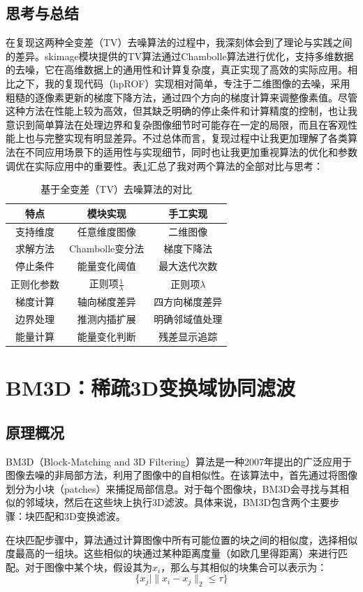 \documentclass[UTF8]{ctexart}
\begin{document}
\subsection{思考与总结}
在复现这两种全变差（TV）去噪算法的过程中，我深刻体会到了理论与实践之间的差异。skimage模块提供的TV算法通过Chambolle算法进行优化，支持多维数据的去噪，它在高维数据上的通用性和计算复杂度，真正实现了高效的实际应用。相比之下，我的复现代码（hpROF）实现相对简单，专注于二维图像的去噪，采用粗糙的逐像素更新的梯度下降方法，通过四个方向的梯度计算来调整像素值。尽管这种方法在性能上较为高效，但其缺乏明确的停⽌条件和计算精度的控制，也让我意识到简单算法在处理边界和复杂图像细节时可能存在一定的局限，而且在客观性能上也与完整实现有明显差异。不过总体而言，复现过程中让我更加理解了各类算法在不同应用场景下的适用性与实现细节，同时也让我更加重视算法的优化和参数调优在实际应用中的重要性。表\ref{tab:tvCompare}汇总了我对两个算法的全部对比与思考：
\begin{table}[htbp]
  \centering
  \caption{基于全变差（TV）去噪算法的对比}
  \label{tab:tvCompare}
  \begin{tabular}{ccc}
  \toprule[1.5pt]
  \textbf{特点} & \textbf{模块实现} & \textbf{手工实现} \\
  \midrule
  支持维度 & 任意维度图像 & 二维图像 \\
  求解方法 & Chambolle变分法 & 梯度下降法 \\
  停止条件 & 能量变化阈值 & 最大迭代次数 \\
  正则化参数 & 正则项$\frac{1}{\lambda}$ & 正则项$\lambda$ \\
  梯度计算 & 轴向梯度差异 & 四方向梯度差异 \\
  边界处理 & 推测内插扩展 & 明确邻域值处理 \\
  能量计算 & 能量变化判断 & 残差显示追踪 \\
  \bottomrule[1.5pt]
  \end{tabular}
\end{table}


\section{BM3D：稀疏3D变换域协同滤波}

\subsection{原理概况}
BM3D（Block-Matching and 3D Filtering）算法是一种2007年提出的广泛应用于图像去噪的非局部方法\cite{dabov_image_nodate}，利用了图像中的自相似性。在该算法中，首先通过将图像划分为小块（patches）来捕捉局部信息。对于每个图像块，BM3D会寻找与其相似的邻域块，然后在这些块上执行3D滤波。具体来说，BM3D包含两个主要步骤：块匹配和3D变换滤波。\par
在块匹配步骤中，算法通过计算图像中所有可能位置的块之间的相似度，选择相似度最高的一组块。这些相似的块通过某种距离度量（如欧几里得距离）来进行匹配。对于图像中某个块，假设其为$x_i$，那么与其相似的块集合可以表示为：
\[
\{ x_j \mid \| x_i - x_j \|_2 \leq \tau \}
\]
\end{document}
